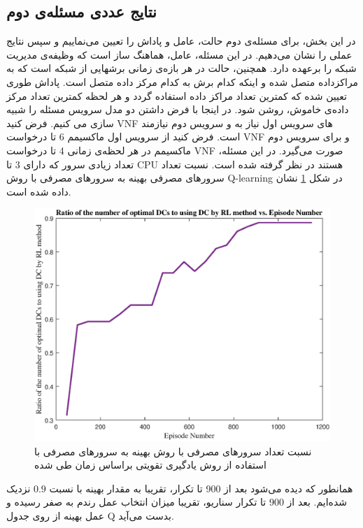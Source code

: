 \subsection{نتایج عددی مسئله‌ی دوم} 
در این بخش، برای مسئله‌ی دوم حالت، عامل و پاداش را تعیین می‌نماییم و سپس نتایج عملی را نشان می‌دهیم.
در این مسئله، عامل، هماهنگ‌‌ ‌ساز است که وظیفه‌ی مدیریت شبکه را برعهده دارد.
همچنین، حالت در هر بازه‌ی زمانی برشهایی از شبکه است که به مراکزداده متصل شده و اینکه کدام برش به کدام مرکز داده متصل است.
پاداش طوری تعیین شده که کمترین تعداد مراکز داده استفاده گردد و هر لحظه کمترین تعداد مرکز داده‌ی خاموش، روشن شود.
در اینجا با فرض داشتن دو مدل سرویس مسئله را شبیه سازی می کنیم. فرض کنید VNF های سرویس اول نیاز به 
و سرویس دوم نیازمند 
است.
فرض کنید از سرویس اول ماکسیمم 6 تا درخواست VNF 
و برای سرویس دوم ماکسیمم در هر لحظه‌ی زمانی 4 تا درخواست VNF صورت می‌گیرد.
در این مسئله، تعداد زیادی سرور که دارای 3 تا CPU هستند در نظر گرفته شده است.
نسبت تعداد سرورهای مصرفی بهینه به سرورهای مصرفی با روش Q-learning  در شکل
\ref{fig:dynamicEpoch2}
نشان داده شده است.
\begin{figure}%
	\centering
	\includegraphics[scale = 0.6]{./fig/ratio_episode2} %
	\caption{   نسبت تعداد سرورهای مصرفی با روش 
		بهینه
		 به سرورهای مصرفی با استفاده از روش یادگیری تقویتی براساس زمان طی شده}
	\label{fig:dynamicEpoch2}
\end{figure}
همانطور که دیده می‌شود بعد از 900
تا تکرار، تقریبا به مقدار بهینه با نسبت $0.9$ نزدیک شده‌ایم.
بعد از 900 تا تکرار سناریو، تقریبا میزان انتخاب عمل رندم به صفر رسیده و عمل بهینه از روی جدول Q بدست می‌آید.
